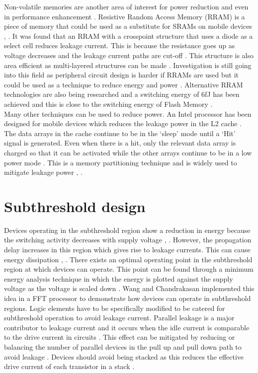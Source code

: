 \documentclass[journal]{IEEEtran}
\begin{document}
Non-volatile memories are another area of interest for power reduction and even in performance enhancement \cite{NonVolatile}. Resistive Random Access Memory (RRAM) is a piece of memory that could be used as a substitute for SRAMs on mobile devices \cite{NonVolatile}, \cite{RRAMSwitch}. It was found that an RRAM with a crosspoint structure that uses a diode as a select cell reduces leakage current. This is because the resistance goes up as voltage decreases and the leakage current paths are cut-off \cite{NonVolatile}. This structure is also area efficient as multi-layered structures can be made \cite{NonVolatile}. Investigation is still going into this field as peripheral circuit design is harder if RRAMs are used but it could be used as a technique to reduce energy and power \cite{NonVolatile}. Alternative RRAM technologies are also being researched and a switching energy of 6fJ has been achieved and this is close to the switching energy of Flash Memory \cite{RRAMSwitch}. \\

Many other techniques can be used to reduce power. An Intel processor has been designed for mobile devices which reduces the leakage power in the L2 cache \cite{Intel}. The data arrays in the cache continue to be in the `sleep' mode until a `Hit' signal is generated. Even when there is a hit, only the relevant data array is charged so that it can be activated while the other arrays continue to be in a low power mode \cite{Intel}. This is a memory partitioning technique and is widely used to mitigate leakage power \cite{Intel}, \cite{L2Mobile}.

\section{Subthreshold design}
Devices operating in the subthreshold region show a reduction in energy because the switching activity decreases with supply voltage \cite{FFT}, \cite{MemSub}. However, the propagation delay increases in this region which gives rise to leakage currents. This can cause energy dissipation \cite{FFT}, \cite{MemSub}. There exists an optimal operating point in the subthreshold region at which devices can operate. This point can be found through a minimum energy analysis technique in which the energy is plotted against the supply voltage as the voltage is scaled down \cite{FFT}. Wang and Chandrakasan \cite{FFT} implemented this idea in a FFT processor to demonstrate how devices can operate in subthreshold regions. Logic elements have to be specifically modified to be catered for subthreshold operation to avoid leakage current. Parallel leakage is a major contributor to leakage current and it occurs when the idle current is comparable to the drive current in circuits \cite{FFT}. This effect can be mitigated by reducing or balancing the number of parallel devices in the pull up and pull down path to avoid leakage \cite{FFT}. Devices should avoid being stacked as this reduces the effective drive current of each transistor in a stack \cite{FFT}. \\
\end{document}
